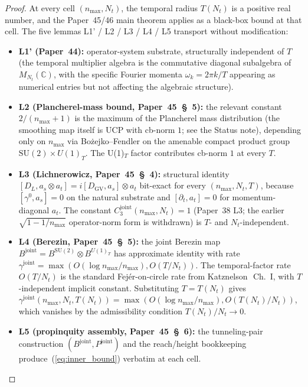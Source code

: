 \documentclass[11pt,a4paper]{article}
\theoremstyle{plain}
\theoremstyle{definition}
\newcommand{\nmax}{n_{\max}}
\newcommand{\Nt}{N_{t}}
\newcommand{\C}{\mathbb{C}}
\newcommand{\SU}{\mathrm{SU}}
\newcommand{\Uone}{U(1)}
\newcommand{\Mat}{M}
\newcommand{\DGV}{D_{\mathrm{GV}}}
\newcommand{\DL}{D_{L}}
\newcommand{\gammajoint}{\gamma^{\mathrm{joint}}}
\newcommand{\Cthreejoint}{C_{3}^{\mathrm{joint}}}
\newcommand{\Bjoint}{B^{\mathrm{joint}}}
\newcommand{\Pjoint}{P^{\mathrm{joint}}}
\begin{document}
\begin{proof}
At every cell $(\nmax, \Nt)$, the temporal radius $T(\Nt)$ is a positive
real number, and the Paper~45/46 main theorem applies as a black-box
bound at that cell. The five lemmas L1' / L2 / L3 / L4 / L5
transport without modification:
\begin{itemize}
\item \textbf{L1' (Paper~44):} operator-system substrate, structurally
independent of $T$ (the temporal multiplier algebra is the commutative
diagonal subalgebra of $\Mat_{\Nt}(\C)$, with the specific Fourier
momenta $\omega_{k} = 2\pi k/T$ appearing as numerical entries but not
affecting the algebraic structure).
\item \textbf{L2 (Plancherel-mass bound, Paper~45~\S~5):}
the relevant constant $2/(\nmax+1)$ is the maximum of the Plancherel
mass distribution (the smoothing map itself is UCP with cb-norm $1$;
see the Status note), depending only on
$\nmax$ via Bo\.zejko--Fendler on the amenable compact product group
$\SU(2)\times\Uone_{T}$. The U(1)$_{T}$ factor contributes cb-norm $1$
at every $T$.
\item \textbf{L3 (Lichnerowicz, Paper~45~\S~4):} structural identity
$[\DL, a_{s}\otimes a_{t}] = i[\DGV, a_{s}]\otimes a_{t}$ bit-exact for
every $(\nmax, \Nt, T)$, because $[\gamma^{0}, a_{s}] = 0$ on the
natural substrate and $[\partial_{t}, a_{t}] = 0$ for momentum-diagonal
$a_{t}$. The constant $\Cthreejoint(\nmax, \Nt) = 1$ (Paper~38 L3; the earlier
$\sqrt{1 - 1/\nmax}$ operator-norm form is withdrawn) is $T$- and
$\Nt$-independent.
\item \textbf{L4 (Berezin, Paper~45~\S~5):} the joint Berezin map
$B^{\mathrm{joint}} = B^{\SU(2)} \otimes B^{U(1)_{T}}$ has approximate
identity with rate
$\gammajoint = \max(O(\log\nmax/\nmax), O(T/\Nt))$. The temporal-factor
rate $O(T/\Nt)$ is the standard Fej\'er-on-circle rate from
Katznelson~\cite{katznelson2004}\,Ch.~I, with $T$-independent implicit
constant. Substituting $T = T(\Nt)$ gives $\gammajoint(\nmax, \Nt,
T(\Nt)) = \max(O(\log\nmax/\nmax), O(T(\Nt)/\Nt))$, which vanishes by
the admissibility condition $T(\Nt)/\Nt \to 0$.
\item \textbf{L5 (propinquity assembly, Paper~45~\S~6):} the
tunneling-pair construction $(\Bjoint, \Pjoint)$ and the
reach/height bookkeeping produce~(\ref{eq:inner_bound}) verbatim at each
cell.
\end{itemize}
\end{proof}
\end{document}
